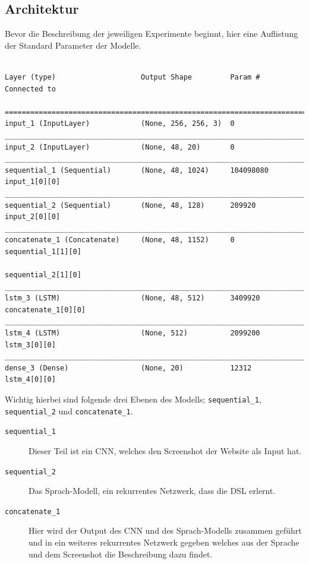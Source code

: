 \documentclass[pdftex,a4paper,halfparskip, article]{scrartcl}
\begin{document}
\subsection*{Architektur}\label{sub:architektur}
Bevor die Beschreibung der jeweiligen Experimente beginnt, hier eine Auflistung der Standard Parameter der Modelle. 

\begin{verbatim}

Layer (type)                    Output Shape         Param #     Connected to

=============================================================================
input_1 (InputLayer)            (None, 256, 256, 3)  0
_____________________________________________________________________________
input_2 (InputLayer)            (None, 48, 20)       0
_____________________________________________________________________________
sequential_1 (Sequential)       (None, 48, 1024)     104098080   input_1[0][0]
_____________________________________________________________________________
sequential_2 (Sequential)       (None, 48, 128)      209920      input_2[0][0]
_____________________________________________________________________________
concatenate_1 (Concatenate)     (None, 48, 1152)     0           sequential_1[1][0]
                                                                 sequential_2[1][0]
_____________________________________________________________________________
lstm_3 (LSTM)                   (None, 48, 512)      3409920     concatenate_1[0][0]
_____________________________________________________________________________
lstm_4 (LSTM)                   (None, 512)          2099200     lstm_3[0][0]
_____________________________________________________________________________
dense_3 (Dense)                 (None, 20)           12312       lstm_4[0][0]
\end{verbatim}

Wichtig hierbei sind folgende drei Ebenen des Modells; \texttt{sequential\_1}, \texttt{sequential\_2} und \texttt{concatenate\_1}. 

\begin{description}
	\item[\texttt{sequential\_1}] Dieser Teil ist ein CNN, welches den Screenshot der Website als Input hat.
	\item[\texttt{sequential\_2}] Das Sprach-Modell, ein rekurrentes Netzwerk, dass die DSL erlernt.
	\item[\texttt{concatenate\_1}] Hier wird der Output des CNN und des Sprach-Modells zusammen geführt und in ein weiteres rekurrentes Netzwerk gegeben welches aus der Sprache und dem Screenshot die Beschreibung dazu findet.
\end{description}
\end{document}
